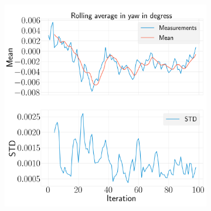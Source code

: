 \documentclass[../Head/report.tex]{subfiles}
\begin{document}
\begin{figure}[H]
\begin{subfigure}[t]{.30\textwidth}
        \caption{}
        \label{fig:GPS2Vision_pose_estimation_test2_roll}
    \end{subfigure}
     \hspace{0.2em}
    \begin{subfigure}[t]{.30\textwidth}
        \centering
        \includegraphics[width=\textwidth]{../Figures/analyse_rolling_average/test1/Calculated_rolling_average_in_yaw_with_mean_and_STD.png}
        \caption{}
        \label{fig:GPS2Vision_pose_estimation_test2_roll}
    \end{subfigure}
    \caption{}
    \label{fig:GPS2Vision_pose_estimation_test2_error_ori}
\end{figure}
\end{document}
